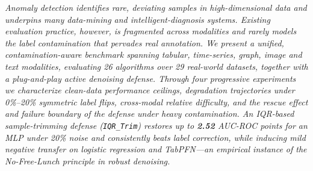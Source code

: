 \begin{minipage}{\textwidth}
\vspace{0.6em}
\;
{\itshape Anomaly detection identifies rare, deviating samples in high-dimensional data and underpins many data-mining and intelligent-diagnosis systems. Existing evaluation practice, however, is fragmented across modalities and rarely models the label contamination that pervades real annotation. We present a unified, contamination-aware benchmark spanning tabular, time-series, graph, image and text modalities, evaluating 26 algorithms over 29 real-world datasets, together with a plug-and-play active denoising defense. Through four progressive experiments we characterize clean-data performance ceilings, degradation trajectories under 0\%--20\% symmetric label flips, cross-modal relative difficulty, and the rescue effect and failure boundary of the defense under heavy contamination. An IQR-based sample-trimming defense (\texttt{IQR\_Trim}) restores up to \textbf{2.52} AUC-ROC points for an MLP under 20\% noise and consistently beats label correction, while inducing mild negative transfer on logistic regression and TabPFN---an empirical instance of the No-Free-Lunch principle in robust denoising.}\par
\vspace{0.4em}
\par
\end{minipage}

\vspace{1.2em}
